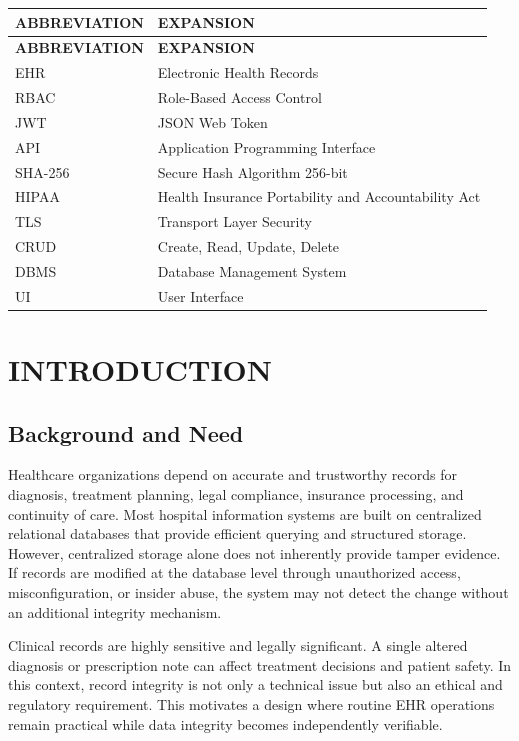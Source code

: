 \documentclass[12pt,a4paper]{report}
\begin{document}
\begin{longtable}{p{} p{}}
\toprule
\textbf{ABBREVIATION} & \textbf{EXPANSION} \\
\midrule
\endfirsthead
\toprule
\textbf{ABBREVIATION} & \textbf{EXPANSION} \\
\midrule
\endhead
\bottomrule
\endfoot

EHR & Electronic Health Records \\
RBAC & Role-Based Access Control \\
JWT & JSON Web Token \\
API & Application Programming Interface \\
SHA-256 & Secure Hash Algorithm 256-bit \\
HIPAA & Health Insurance Portability and Accountability Act \\
TLS & Transport Layer Security \\
CRUD & Create, Read, Update, Delete \\
DBMS & Database Management System \\
UI & User Interface \\

\end{longtable}

\newpage
{}
\setcounter{page}{1}

\chapter{INTRODUCTION}

\section{Background and Need}

Healthcare organizations depend on accurate and trustworthy records for diagnosis, treatment planning, legal compliance, insurance processing, and continuity of care. Most hospital information systems are built on centralized relational databases that provide efficient querying and structured storage. However, centralized storage alone does not inherently provide tamper evidence. If records are modified at the database level through unauthorized access, misconfiguration, or insider abuse, the system may not detect the change without an additional integrity mechanism.

Clinical records are highly sensitive and legally significant. A single altered diagnosis or prescription note can affect treatment decisions and patient safety. In this context, record integrity is not only a technical issue but also an ethical and regulatory requirement. This motivates a design where routine EHR operations remain practical while data integrity becomes independently verifiable.
\end{document}
